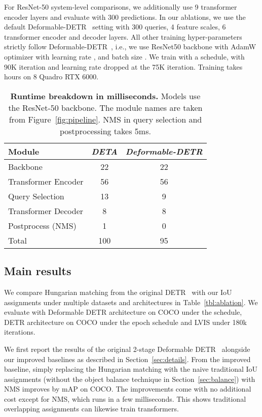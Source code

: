 \documentclass[10pt,twocolumn,letterpaper]{article}
\newcommand{\ddetr}{{\textit{Deformable-DETR}}\xspace}
\newcommand{\reffig}[1]{Figure~\ref{fig:#1}}
\newcommand{\refsec}[1]{Section~\ref{sec:#1}}
\newcommand{\reftbl}[1]{Table~\ref{tbl:#1}}
\newcommand{\lbltbl}[1]{\label{tbl:#1}}
\def\name{{\textit{DETA}}\xspace}
\begin{document}
For ResNet-50 system-level comparisons, we additionally use 9 transformer encoder layers and evaluate with 300 predictions.
In our ablations, we use the default Deformable-DETR~\cite{zhu2020deformable} setting with 300 queries, 4 feature scales, 6 transformer encoder and decoder layers.
All other training hyper-parameters strictly follow Deformable-DETR~\cite{zhu2020deformable},
i.e., we use ResNet50 backbone with AdamW optimizer with learning rate , and batch size .
We train with a  schedule, with 90K iteration and learning rate dropped at the 75K iteration.
Training takes  hours on 8 Quadro RTX 6000. 

\begin{table}
\begin{tabular}{lcc}
\toprule
Module              & \name& \ddetr{}  \\
\midrule                    
Backbone            & 22   & 22        \\
Transformer Encoder & 56   & 56        \\
Query Selection     & 13   & 9         \\
Transformer Decoder & 8    & 8         \\
Postprocess (NMS)   & 1    & 0         \\
\midrule                    
Total               & 100  & 95       \\
\bottomrule
\end{tabular}
\caption{\textbf{Runtime breakdown in milliseconds.}
Models use the ResNet-50 backbone.
The module names are taken from \reffig{pipeline}.
NMS in query selection and postprocessing takes 5ms.
}
\lbltbl{runtime_breakdown}
\end{table}




\subsection{Main results}
We compare Hungarian matching from the original DETR~\cite{carion2020end} with our IoU assignments under multiple datasets and architectures in \reftbl{ablation}.
We evaluate with Deformable DETR architecture on COCO under the  schedule, DETR architecture on COCO under the  epoch schedule and LVIS under 180k iterations.

We first report the results of the original 2-stage Deformable DETR~\cite{zhu2020deformable} alongside our improved baselines as described in \refsec{details}.
From the improved baseline, simply replacing the Hungarian matching with the naive traditional IoU assignments (without the object balance technique in \refsec{balance}) with NMS improves by  mAP on COCO.
The improvements come with no additional cost except for NMS, which runs in a few milliseconds.
This shows traditional overlapping assignments can likewise train transformers.
\end{document}
